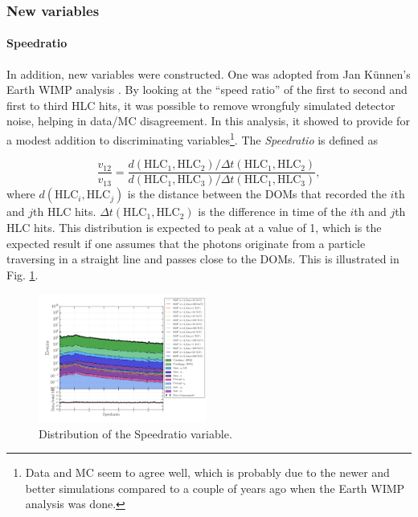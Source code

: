 \subsubsection{New variables}

\paragraph{Speedratio}
In addition, new variables were constructed. One was adopted from Jan K\"unnen's Earth WIMP analysis \cite{kunnenthesis}. By looking at the ``speed ratio'' of the first to second and first to third HLC hits, it was possible to remove wrongfuly simulated detector noise, helping in data/MC disagreement. In this analysis, it showed to provide for a modest addition to discriminating variables\footnote{Data and MC seem to agree well, which is probably due to the newer and better simulations compared to a couple of years ago when the Earth WIMP analysis was done.}. The \textit{Speedratio} is defined as

\begin{equation}
\frac{v_{12}}{v_{13}} = \frac{d\left( \textrm{HLC}_1,\textrm{HLC}_2 \right)/\Delta t\left(\textrm{HLC}_1, \textrm{HLC}_2\right)}{d\left(\textrm{HLC}_1, \textrm{HLC}_3 \right)/\Delta t\left(\textrm{HLC}_1,\textrm{HLC}_3 \right)},
\end{equation}
where $d\left( \textrm{HLC}_i,\textrm{HLC}_j \right)$ is the distance between the DOMs that recorded the $i$th and $j$th HLC hits. $\Delta t\left(\textrm{HLC}_1, \textrm{HLC}_2\right)$ is the difference in time of the $i$th and $j$th HLC hits. This distribution is expected to peak at a value of 1, which is the expected result if one assumes that the photons originate from a particle traversing in a straight line and passes close to the DOMs. This is illustrated in Fig. \ref{fig:newvariables1}.

\begin{figure}
\centering
\includegraphics[width=0.49\textwidth]{chapter8/img/1D_stack_speedratio.png}
\caption{Distribution of the Speedratio variable.}
\label{fig:newvariables1}
\end{figure}


